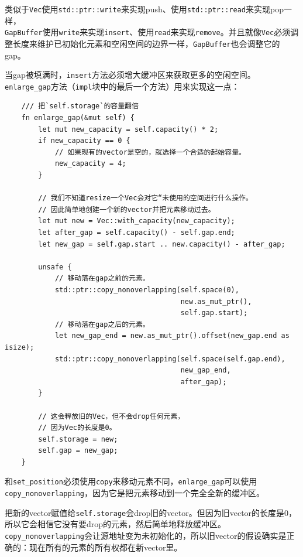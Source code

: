 类似于\texttt{Vec}使用\texttt{std::ptr::write}来实现push、使用\texttt{std::ptr::read}来实现pop一样，\\
\texttt{GapBuffer}使用\texttt{write}来实现\texttt{insert}、使用\texttt{read}来实现\texttt{remove}。并且就像\texttt{Vec}必须调整长度来维护已初始化元素和空闲空间的边界一样，\texttt{GapBuffer}也会调整它的gap。

当gap被填满时，\texttt{insert}方法必须增大缓冲区来获取更多的空闲空间。\texttt{enlarge\_gap}方法（\texttt{impl}块中的最后一个方法）用来实现这一点：
\begin{verbatim}
    /// 把`self.storage`的容量翻倍
    fn enlarge_gap(&mut self) {
        let mut new_capacity = self.capacity() * 2;
        if new_capacity == 0 {
            // 如果现有的vector是空的，就选择一个合适的起始容量。
            new_capacity = 4;
        }

        // 我们不知道resize一个Vec会对它“未使用的空间进行什么操作。
        // 因此简单地创建一个新的vector并把元素移动过去。
        let mut new = Vec::with_capacity(new_capacity);
        let after_gap = self.capacity() - self.gap.end;
        let new_gap = self.gap.start .. new.capacity() - after_gap;

        unsafe {
            // 移动落在gap之前的元素。
            std::ptr::copy_nonoverlapping(self.space(0),
                                          new.as_mut_ptr(),
                                          self.gap.start);
            // 移动落在gap之后的元素。
            let new_gap_end = new.as_mut_ptr().offset(new_gap.end as isize);
            std::ptr::copy_nonoverlapping(self.space(self.gap.end),
                                          new_gap_end,
                                          after_gap);
        }

        // 这会释放旧的Vec，但不会drop任何元素，
        // 因为Vec的长度是0。
        self.storage = new;
        self.gap = new_gap;
    }
\end{verbatim}

和\texttt{set\_position}必须使用\texttt{copy}来移动元素不同，\texttt{enlarge\_gap}可以使用\\
\texttt{copy\_nonoverlapping}，因为它是把元素移动到一个完全全新的缓冲区。

把新的vector赋值给\texttt{self.storage}会drop旧的vector。但因为旧vector的长度是0，所以它会相信它没有要drop的元素，然后简单地释放缓冲区。\texttt{copy\_nonoverlapping}会让源地址变为未初始化的，所以旧vector的假设确实是正确的：现在所有的元素的所有权都在新vector里。

